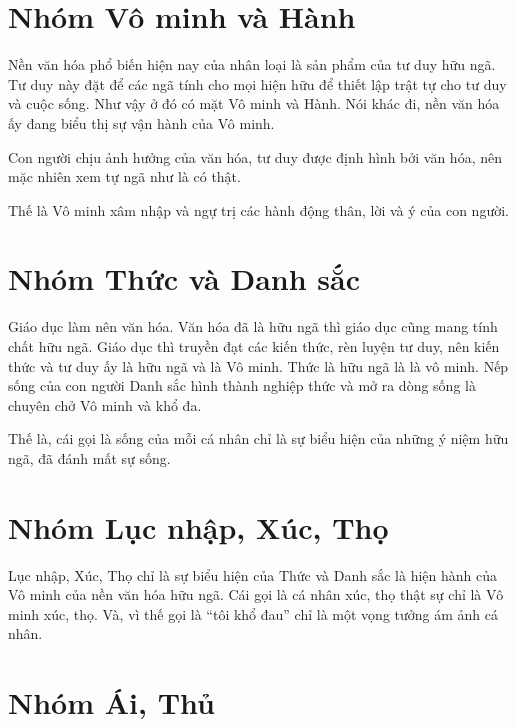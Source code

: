 \section{Nhóm Vô minh và Hành} %
\label{sec:vo_minh_va_hanh}

Nền văn hóa phổ biến hiện nay của nhân loại là sản phẩm của tư duy hữu ngã. Tư duy này đặt để các ngã tính cho mọi hiện hữu để thiết lập trật tự cho tư duy và cuộc sống. Như vậy ở đó có mặt Vô minh và Hành. Nói khác đi, nền văn hóa ấy đang biểu thị sự vận hành của Vô minh.

Con người chịu ảnh hưởng của văn hóa, tư duy được định hình bởi văn hóa, nên mặc nhiên xem tự ngã như là có thật.

Thế là Vô minh xâm nhập và ngự trị các hành động thân, lời và ý của con người.


\section{Nhóm Thức và Danh sắc} %
\label{sec:thuc_va_danh_sac}

Giáo dục làm nên văn hóa. Văn hóa đã là hữu ngã thì giáo dục cũng mang tính chất hữu ngã. Giáo dục thì truyền đạt các kiến thức, rèn luyện tư duy, nên kiến thức và tư duy ấy là hữu ngã và là Vô minh. Thức là hữu ngã là là vô minh. Nếp sống của con người Danh sắc hình thành nghiệp thức và mở ra dòng sống là chuyên chở Vô minh và khổ đa.

Thế là, cái gọi là sống của mỗi cá nhân chỉ là sự biểu hiện của những ý niệm hữu ngã, đã đánh mất sự sống.


\section{Nhóm Lục nhập, Xúc, Thọ} %
\label{sec:luc_nhap_xuc_tho}

Lục nhập, Xúc, Thọ chỉ là sự biểu hiện của Thức và Danh sắc là hiện hành của Vô minh của nền văn hóa hữu ngã. Cái gọi là cá nhân xúc, thọ thật sự chỉ là Vô minh xúc, thọ. Và, vì thế gọi là ``tôi khổ đau'' chỉ là một vọng tưởng ám ảnh cá nhân.


\section{Nhóm Ái, Thủ} %
\label{sec:ai_thu}

